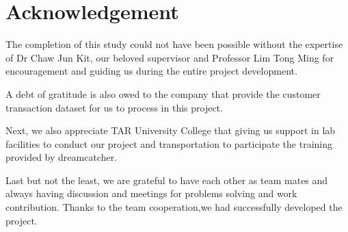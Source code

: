 \documentclass[journal]{IEEEtran}
\begin{document}
	
	
	
	
	
	\section*{Acknowledgement}
	The completion of this study could not have been possible without the expertise of Dr Chaw Jun Kit, our beloved supervisor and Professor Lim Tong Ming for encouragement and guiding us during the entire project development.
	
	A debt of gratitude is also owed to the company that provide the customer transaction dataset for us to process in this project.
	
	Next, we also appreciate TAR University College that giving us support in lab facilities to conduct our project and transportation to participate the training provided by dreamcatcher.
	
	Last but not the least, we are grateful to have each other as team mates and always having discussion and meetings for problems solving and work contribution. Thanks to the team cooperation,we had successfully developed the project.
	\newpage
	\ifCLASSOPTIONcaptionsoff
	\newpage
	\fi
	
\end{document}
